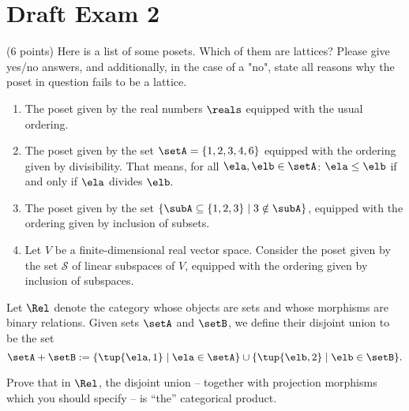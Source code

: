 \documentclass[paper=8.125in:10.250in,pagesize=pdftex,
    headinclude=false,footinclude=false,oneside,egregdoesnotlikesansseriftitles]{kaobook}
\begin{document}
\newpage

\section*{Draft Exam 2}

\begin{gradedexercise}
(6 points) Here is a list of some posets. Which of them are lattices? 
Please give yes/no answers, and additionally, in the case of a "no", state all reasons why the poset in question fails to be a lattice. 
\begin{enumerate}
\item The poset given by the real numbers $\reals$ equipped with the usual ordering. 
\item The poset given by the set $\setA = \{ 1, 2, 3, 4, 6\}$ equipped with the ordering given by divisibility. That means, for all $\ela, \elb \in \setA$: $\ela \leq \elb$ if and only if $\ela$ divides $\elb.$ 
\item The poset given by the set $\{ \subA \subseteq \{1, 2 , 3 \} \mid 3 \notin \subA \}$, equipped with the ordering given by inclusion of subsets. 
\item Let $V$ be a finite-dimensional real vector space. Consider the poset given by the set $\mathcal{S}$ of linear subspaces of $V$, equipped with the ordering given by inclusion of subspaces. 
\end{enumerate}
\end{gradedexercise}

\begin{gradedexercise}
Let $\Rel$ denote the category whose objects are sets and whose morphisms are binary relations. Given sets $\setA$ and $\setB$, we define their disjoint union to be the set
$$
\setA + \setB := \{ \tup{\ela, 1} \mid \ela \in \setA \} \cup \{ \tup{\elb, 2} \mid \elb \in \setB \}.
$$

Prove that in $\Rel$, the disjoint union -- together with projection morphisms which you should specify -- is ``the'' categorical product. 
\end{gradedexercise}
\end{document}

